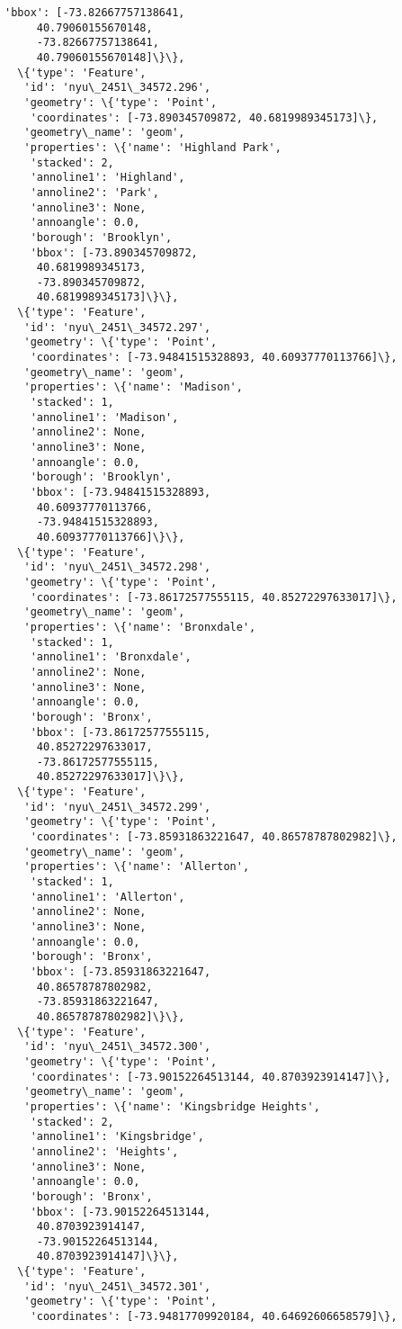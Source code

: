 \documentclass[11pt]{article}
\begin{document}
\begin{tcolorbox}[breakable, size=fbox, boxrule=.5pt, pad at break*=1mm, opacityfill=0]
\begin{Verbatim}[commandchars=\\\{\}]
    'bbox': [-73.82667757138641,
     40.79060155670148,
     -73.82667757138641,
     40.79060155670148]\}\},
  \{'type': 'Feature',
   'id': 'nyu\_2451\_34572.296',
   'geometry': \{'type': 'Point',
    'coordinates': [-73.890345709872, 40.6819989345173]\},
   'geometry\_name': 'geom',
   'properties': \{'name': 'Highland Park',
    'stacked': 2,
    'annoline1': 'Highland',
    'annoline2': 'Park',
    'annoline3': None,
    'annoangle': 0.0,
    'borough': 'Brooklyn',
    'bbox': [-73.890345709872,
     40.6819989345173,
     -73.890345709872,
     40.6819989345173]\}\},
  \{'type': 'Feature',
   'id': 'nyu\_2451\_34572.297',
   'geometry': \{'type': 'Point',
    'coordinates': [-73.94841515328893, 40.60937770113766]\},
   'geometry\_name': 'geom',
   'properties': \{'name': 'Madison',
    'stacked': 1,
    'annoline1': 'Madison',
    'annoline2': None,
    'annoline3': None,
    'annoangle': 0.0,
    'borough': 'Brooklyn',
    'bbox': [-73.94841515328893,
     40.60937770113766,
     -73.94841515328893,
     40.60937770113766]\}\},
  \{'type': 'Feature',
   'id': 'nyu\_2451\_34572.298',
   'geometry': \{'type': 'Point',
    'coordinates': [-73.86172577555115, 40.85272297633017]\},
   'geometry\_name': 'geom',
   'properties': \{'name': 'Bronxdale',
    'stacked': 1,
    'annoline1': 'Bronxdale',
    'annoline2': None,
    'annoline3': None,
    'annoangle': 0.0,
    'borough': 'Bronx',
    'bbox': [-73.86172577555115,
     40.85272297633017,
     -73.86172577555115,
     40.85272297633017]\}\},
  \{'type': 'Feature',
   'id': 'nyu\_2451\_34572.299',
   'geometry': \{'type': 'Point',
    'coordinates': [-73.85931863221647, 40.86578787802982]\},
   'geometry\_name': 'geom',
   'properties': \{'name': 'Allerton',
    'stacked': 1,
    'annoline1': 'Allerton',
    'annoline2': None,
    'annoline3': None,
    'annoangle': 0.0,
    'borough': 'Bronx',
    'bbox': [-73.85931863221647,
     40.86578787802982,
     -73.85931863221647,
     40.86578787802982]\}\},
  \{'type': 'Feature',
   'id': 'nyu\_2451\_34572.300',
   'geometry': \{'type': 'Point',
    'coordinates': [-73.90152264513144, 40.8703923914147]\},
   'geometry\_name': 'geom',
   'properties': \{'name': 'Kingsbridge Heights',
    'stacked': 2,
    'annoline1': 'Kingsbridge',
    'annoline2': 'Heights',
    'annoline3': None,
    'annoangle': 0.0,
    'borough': 'Bronx',
    'bbox': [-73.90152264513144,
     40.8703923914147,
     -73.90152264513144,
     40.8703923914147]\}\},
  \{'type': 'Feature',
   'id': 'nyu\_2451\_34572.301',
   'geometry': \{'type': 'Point',
    'coordinates': [-73.94817709920184, 40.64692606658579]\},

\end{Verbatim}
\end{tcolorbox}
\end{document}
